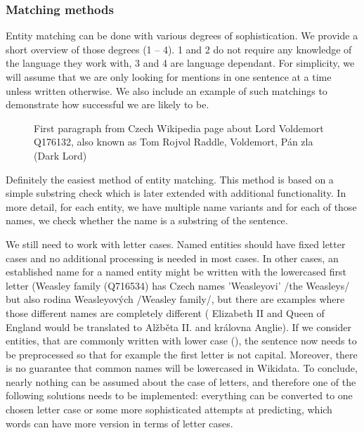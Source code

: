 \subsubsection{Matching methods}
Entity matching can be done with various degrees of sophistication. We provide a short overview of those degrees (1 -- 4). 1 and 2 do not require any knowledge of the language they work with, 3 and 4 are language dependant. For simplicity, we will assume that we are only looking for mentions in one sentence at a time unless written otherwise. We also include an example of such matchings to demonstrate how successful we are likely to be.

\begin{figure}


\caption{First paragraph from Czech Wikipedia page about Lord Voldemort Q176132, also known as Tom Rojvol Raddle, Voldemort, Pán zla (Dark Lord) }


\end{figure}


 Definitely the easiest method of entity matching. This method is based on a simple substring check which is later extended with additional functionality. In more detail, for each entity, we have multiple name variants and for each of those names, we check whether the name is a substring of the sentence.

We still need to work with letter cases. Named entities should have fixed letter cases and no additional processing is needed in most cases. In other cases, an established name for a named entity might be written with the lowercased first letter (Weasley family (Q716534) has Czech names 'Weasleyovi' /the Weasleys/ but also rodina Weasleyových /Weasley family/, but there are examples where those different names are completely different ( Elizabeth II and Queen of England would be translated to Alžběta II. and královna Anglie). If we consider entities, that are commonly written with lower case (), the sentence now needs to be preprocessed so that for example the first letter is not capital. Moreover, there is no guarantee that common names will be lowercased in Wikidata. To conclude, nearly nothing can be assumed about the case of letters, and therefore one of the following solutions needs to be implemented: everything can be converted to one chosen letter case or some more sophisticated attempts at predicting, which words can have more version in terms of letter cases.

